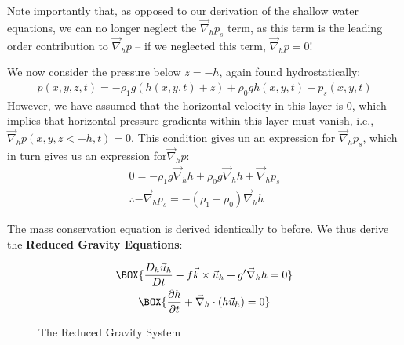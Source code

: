 Note importantly that, as opposed to our derivation of the shallow water equations, we can no longer neglect the $\vec{\nabla}_h p_s$ term, as this term is the leading order contribution to $\vec{\nabla}_h p$ – if we neglected this term, $\vec{\nabla}_h p=0$!

We now consider the pressure below $z=-h$, again found hydrostatically:
\begin{align*}
    p(x,y,z,t) = -\rho_1 g ( h(x,y,t) + z) + \rho_0 g h(x,y,t) + p_s(x,y,t)
\end{align*}
However, we have assumed that the horizontal velocity in this layer is $0$, which implies that horizontal pressure gradients within this layer must vanish, i.e., $\vec{\nabla}_h p(x,y,z<-h,t)=0$. This condition gives un an expression for $\vec{\nabla}_h p_s$, which in turn gives us an expression for$ \vec{\nabla}_h p$:
\begin{align*}
    0 = -\rho_1 g \vec{\nabla}_h h + \rho_0 g \vec{\nabla}_h h + \vec{\nabla}_h p_s
    \\
    \therefore - \vec{\nabla}_h p_s = - (\rho_1 - \rho_0)\vec{\nabla}_h h
\end{align*}

The mass conservation equation is derived identically to before. We thus derive the \textbf{Reduced Gravity Equations}:

\begin{minipage}{0.48\linewidth}
    \begin{gather}
        \label{RG mom}
        \BOX{\frac{D_h\vec{u}_h}{Dt}+f\vec{k}\times\vec{u}_h+g'\vec{\nabla}_h h=0}\\
        \label{RG mass}
        \BOX{\frac{\partial h}{\partial t}+\vec{\nabla}_h\cdot(h\vec{u}_h)=0}
    \end{gather}
\end{minipage}
\hfill
\begin{minipage}{0.48\linewidth}
    \begin{figure}[H]
        \centering
        \caption{The Reduced Gravity System}
        \label{RG Fig}
    \end{figure}
\end{minipage}

